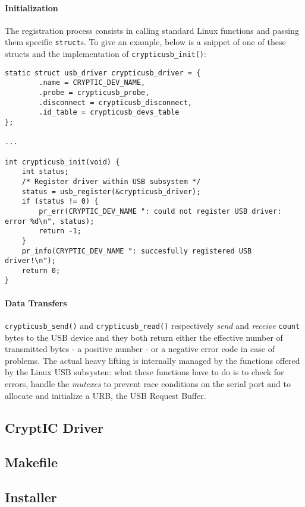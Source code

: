 \paragraph{Initialization} The registration process consists in calling standard Linux functions and passing them specific \texttt{struct}s. To give an example, below is a snippet of one of these structs and the implementation of \texttt{crypticusb\_init()}:
\begin{lstlisting}
static struct usb_driver crypticusb_driver = {
        .name = CRYPTIC_DEV_NAME,
        .probe = crypticusb_probe,
        .disconnect = crypticusb_disconnect,
        .id_table = crypticusb_devs_table
};

...

int crypticusb_init(void) {
    int status;
    /* Register driver within USB subsystem */
    status = usb_register(&crypticusb_driver);
    if (status != 0) {
        pr_err(CRYPTIC_DEV_NAME ": could not register USB driver: error %d\n", status);
        return -1;
    }
    pr_info(CRYPTIC_DEV_NAME ": succesfully registered USB driver!\n");
    return 0;
}
\end{lstlisting}

\paragraph{Data Transfers} \texttt{crypticusb\_send()} and \texttt{crypticusb\_read()} respectively \emph{send} and \emph{receive} \texttt{count} bytes to the USB device and they both return either the effective number of transmitted bytes - a positive number - or a negative error code in case of problems. The actual heavy lifting is internally managed by the functions offered by the Linux USB subsysten: what these functions have to do is to check for errors, handle the \textit{mutexes} to prevent race conditions on the serial port and to allocate and initialize a URB, the USB Request Buffer.

\subsection{CryptIC Driver}
\subsection{Makefile}
\subsection{Installer}
